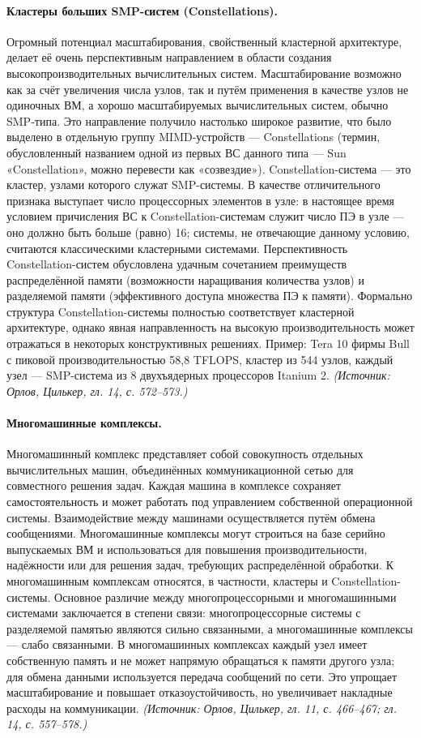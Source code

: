 \documentclass[a4paper,12pt]{article}
\begin{document}
\paragraph{Кластеры больших SMP-систем (Constellations).}
Огромный потенциал масштабирования, свойственный кластерной архитектуре, делает её очень перспективным направлением в области создания высокопроизводительных вычислительных систем. Масштабирование возможно как за счёт увеличения числа узлов, так и путём применения в качестве узлов не одиночных ВМ, а хорошо масштабируемых вычислительных систем, обычно SMP-типа. Это направление получило настолько широкое развитие, что было выделено в отдельную группу MIMD-устройств — Constellations (термин, обусловленный названием одной из первых ВС данного типа — Sun «Constellation», можно перевести как «созвездие»). Constellation-система — это кластер, узлами которого служат SMP-системы. В качестве отличительного признака выступает число процессорных элементов в узле: в настоящее время условием причисления ВС к Constellation-системам служит число ПЭ в узле — оно должно быть больше (равно) 16; системы, не отвечающие данному условию, считаются классическими кластерными системами. Перспективность Constellation-систем обусловлена удачным сочетанием преимуществ распределённой памяти (возможности наращивания количества узлов) и разделяемой памяти (эффективного доступа множества ПЭ к памяти). Формально структура Constellation-системы полностью соответствует кластерной архитектуре, однако явная направленность на высокую производительность может отражаться в некоторых конструктивных решениях. Пример: Tera 10 фирмы Bull с пиковой производительностью 58,8 TFLOPS, кластер из 544 узлов, каждый узел — SMP-система из 8 двухъядерных процессоров Itanium 2.
\textit{(Источник: Орлов, Цилькер, гл. 14, с. 572--573.)}

\paragraph{Многомашинные комплексы.}
Многомашинный комплекс представляет собой совокупность отдельных вычислительных машин, объединённых коммуникационной сетью для совместного решения задач. Каждая машина в комплексе сохраняет самостоятельность и может работать под управлением собственной операционной системы. Взаимодействие между машинами осуществляется путём обмена сообщениями. Многомашинные комплексы могут строиться на базе серийно выпускаемых ВМ и использоваться для повышения производительности, надёжности или для решения задач, требующих распределённой обработки. К многомашинным комплексам относятся, в частности, кластеры и Constellation-системы. Основное различие между многопроцессорными и многомашинными системами заключается в степени связи: многопроцессорные системы с разделяемой памятью являются сильно связанными, а многомашинные комплексы — слабо связанными. В многомашинных комплексах каждый узел имеет собственную память и не может напрямую обращаться к памяти другого узла; для обмена данными используется передача сообщений по сети. Это упрощает масштабирование и повышает отказоустойчивость, но увеличивает накладные расходы на коммуникации.
\textit{(Источник: Орлов, Цилькер, гл. 11, с. 466--467; гл. 14, с. 557--578.)}
\end{document}
